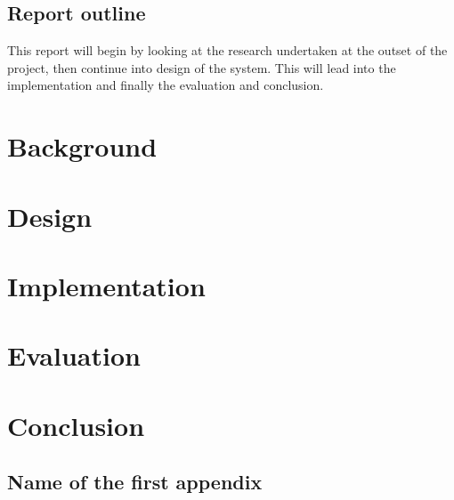 \documentclass{l4proj}
\begin{document}
\section{Report outline}
This report will begin by looking at the research undertaken at the outset of the project, then continue into design of the system. This will lead into the implementation and finally the evaluation and conclusion.
 
 
\chapter{Background}
 
 
\chapter{Design}
 
 
\chapter{Implementation}
 
 
\chapter{Evaluation}
 
 
\chapter{Conclusion}
 
 
\begin{appendices}
 
\chapter{Name of the first appendix}
 
\end{appendices}
 
 


\end{document}
